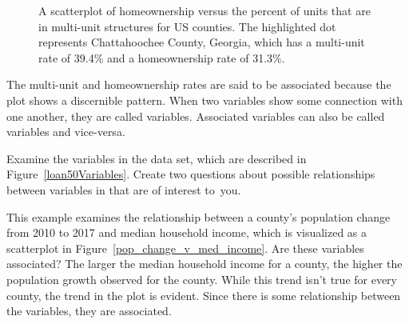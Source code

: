 \begin{figure}[h]
  \centering
  \caption{A scatterplot of homeownership versus the percent
      of units that are in multi-unit structures for US counties.
      The highlighted dot represents Chattahoochee County, Georgia,
      which has a multi-unit rate of 39.4\% and a homeownership rate
      of 31.3\%.}
  \label{multiunitsVsOwnership}
\end{figure}

The multi-unit and homeownership rates are said to be
associated because the plot shows a discernible pattern.
When two variables show some connection with one another,
they are called  variables.
Associated variables can also be called 
variables and vice-versa.

\D{\newpage}

\begin{exercisewrap}
\begin{nexercise}
Examine the variables in the  data set,
which are described in Figure~\vref{loan50Variables}.
Create two questions about possible relationships
between variables in  that are of interest
to~you.\footnotemark
\end{nexercise}
\end{exercisewrap}

\begin{examplewrap}
\begin{nexample}{This example examines the relationship
    between a county's population change
    from 2010 to 2017
    and median household income,
    which is visualized as a scatterplot in
    Figure~\ref{pop_change_v_med_income}.
    Are these variables associated?}
  The larger the median household income for a county,
  the higher the population growth observed for the county.
  While this trend isn't true for every county,
  the trend in the plot is evident.
  Since there is some relationship between the variables,
  they are associated.
\end{nexample}
\end{examplewrap}

